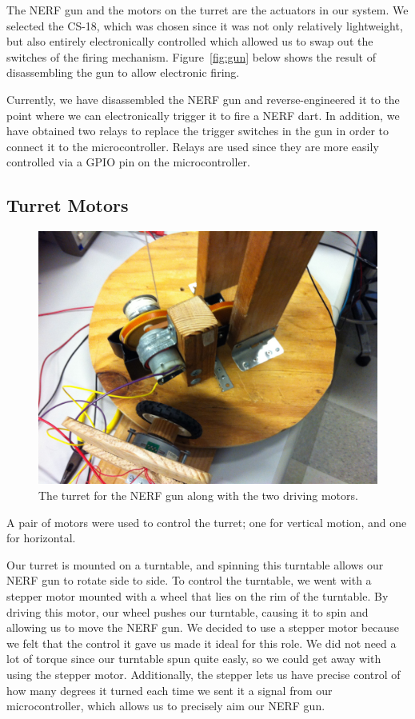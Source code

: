 \documentclass[journal]{IEEEtran}
\begin{document}
The NERF gun and the motors on the turret are the actuators in our system. We selected the CS-18, which was chosen since it was not only relatively lightweight, but also entirely electronically controlled which allowed us to swap out the switches of the firing mechanism. Figure~\ref{fig:gun} below shows the result of disassembling the gun to allow electronic firing.

Currently, we have disassembled the NERF gun and reverse-engineered it to the point where we can electronically trigger it to fire a NERF dart. In addition, we have obtained two relays to replace the trigger switches in the gun in order to connect it to the microcontroller. Relays are used since they are more easily controlled via a GPIO pin on the microcontroller.


\subsection{Turret Motors}

\begin{figure}[htbp]
    \centering
    \includegraphics[width=0.80\linewidth]{motors.jpg}
    \caption{The turret for the NERF gun along with the two driving motors.}
    \label{fig:motor}
\end{figure}

A pair of motors were used to control the turret; one for vertical motion, and one for horizontal.

Our turret is mounted on a turntable, and spinning this turntable allows our NERF gun to rotate side to side. To control the turntable, we went with a stepper motor mounted with a wheel that lies on the rim of the turntable. By driving this motor, our wheel pushes our turntable, causing it to spin and allowing us to move the NERF gun. We decided to use a stepper motor because we felt that the control it gave us made it ideal for this role. We did not need a lot of torque since our turntable spun quite easly, so we could get away with using the stepper motor. Additionally, the stepper lets us have precise control of how many degrees it turned each time we sent it a signal from our microcontroller, which allows us to precisely aim our NERF gun.
\end{document}
